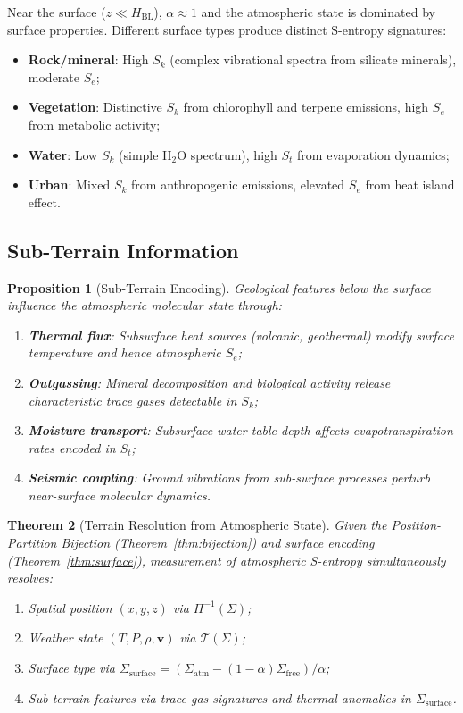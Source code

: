 \documentclass[twocolumn,10pt]{article}
\newtheorem{theorem}{Theorem}[section]
\newtheorem{proposition}[theorem]{Proposition}
\theoremstyle{definition}
\newcommand{\Sk}{S_k}
\newcommand{\St}{S_t}
\newcommand{\Se}{S_e}
\begin{document}
Near the surface ($z \ll H_{\mathrm{BL}}$), $\alpha \approx 1$ and the atmospheric state is dominated by surface properties. Different surface types produce distinct S-entropy signatures:

\begin{itemize}[nosep]
    \item \textbf{Rock/mineral}: High $\Sk$ (complex vibrational spectra from silicate minerals), moderate $\Se$;
    \item \textbf{Vegetation}: Distinctive $\Sk$ from chlorophyll and terpene emissions, high $\Se$ from metabolic activity;
    \item \textbf{Water}: Low $\Sk$ (simple H$_2$O spectrum), high $\St$ from evaporation dynamics;
    \item \textbf{Urban}: Mixed $\Sk$ from anthropogenic emissions, elevated $\Se$ from heat island effect.
\end{itemize}

\subsection{Sub-Terrain Information}

\begin{proposition}[Sub-Terrain Encoding]\label{prop:subterrain}
Geological features below the surface influence the atmospheric molecular state through:
\begin{enumerate}[nosep]
    \item \textbf{Thermal flux}: Subsurface heat sources (volcanic, geothermal) modify surface temperature and hence atmospheric $\Se$;
    \item \textbf{Outgassing}: Mineral decomposition and biological activity release characteristic trace gases detectable in $\Sk$;
    \item \textbf{Moisture transport}: Subsurface water table depth affects evapotranspiration rates encoded in $\St$;
    \item \textbf{Seismic coupling}: Ground vibrations from sub-surface processes perturb near-surface molecular dynamics.
\end{enumerate}
\end{proposition}

\begin{theorem}[Terrain Resolution from Atmospheric State]\label{thm:terrain}
Given the Position-Partition Bijection (Theorem~\ref{thm:bijection}) and surface encoding (Theorem~\ref{thm:surface}), measurement of atmospheric S-entropy simultaneously resolves:
\begin{enumerate}[nosep]
    \item Spatial position $(x, y, z)$ via $\Pi^{-1}(\Sigma)$;
    \item Weather state $(T, P, \rho, \mathbf{v})$ via $\mathcal{T}(\Sigma)$;
    \item Surface type via $\Sigma_{\mathrm{surface}} = (\Sigma_{\mathrm{atm}} - (1-\alpha)\Sigma_{\mathrm{free}})/\alpha$;
    \item Sub-terrain features via trace gas signatures and thermal anomalies in $\Sigma_{\mathrm{surface}}$.
\end{enumerate}
\end{theorem}
\end{document}
